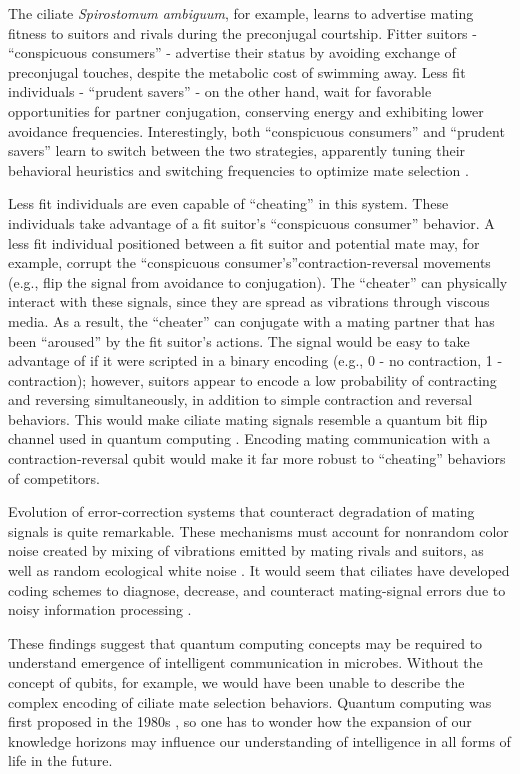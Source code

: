 The ciliate \textit{Spirostomum ambiguum}, for example, learns to advertise mating fitness to suitors and rivals during the preconjugal courtship. Fitter suitors - ``conspicuous consumers'' - advertise their status by avoiding exchange of preconjugal touches, despite the metabolic cost of swimming away. Less fit individuals - ``prudent savers'' - on the other hand, wait for favorable opportunities for partner conjugation, conserving energy and exhibiting lower avoidance frequencies. Interestingly, both ``conspicuous consumers'' and ``prudent savers'' learn to switch between the two strategies, apparently tuning their behavioral heuristics and switching frequencies to optimize mate selection \cite{clark_origins_2010}.

Less fit individuals are even capable of ``cheating'' in this system.  These individuals take advantage of a fit suitor’s ``conspicuous consumer'' behavior. A less fit individual positioned between a fit suitor and potential mate may, for example, corrupt the ``conspicuous consumer’s''contraction-reversal movements (e.g., flip the signal from avoidance to conjugation). The ``cheater'' can physically interact with these signals, since they are spread as vibrations through viscous media. As a result, the ``cheater'' can conjugate with a mating partner that has been ``aroused'' by the fit suitor's actions. The signal would be easy to take advantage of if it were scripted in a binary encoding (e.g., 0 - no contraction, 1 - contraction); however, suitors appear to encode a low probability of contracting and reversing simultaneously, in addition to simple contraction and reversal behaviors. This would make ciliate mating signals resemble a quantum bit flip channel used in quantum computing \cite{Clark, 2010b}. Encoding mating communication with a contraction-reversal qubit would make it far more robust to ``cheating'' behaviors of competitors.

Evolution of error-correction systems that counteract degradation of mating signals is quite remarkable. These mechanisms must account for nonrandom color noise created by mixing of vibrations emitted by mating rivals and suitors, as well as random ecological white noise \cite{clark_classical_2010}. It would seem that ciliates have developed coding schemes to diagnose, decrease, and counteract mating-signal errors due to noisy information processing \cite{clark_ciliates_2013}. 

These findings suggest that quantum computing concepts may be required to understand emergence of intelligent communication in microbes. Without the concept of qubits, for example, we would have been unable to describe the complex encoding of ciliate mate selection behaviors. Quantum computing was first proposed in the 1980s \cite{manin_computable_????,feynman_simulating_1982}, so one has to wonder how the expansion of our knowledge horizons may influence our understanding of intelligence in all forms of life in the future.

